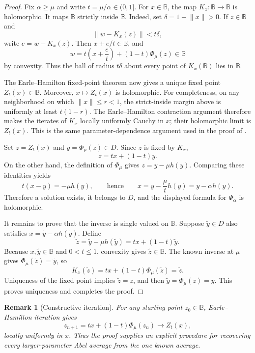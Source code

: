\documentclass[11pt]{article}
\newtheorem{remark}{Remark}
\newcommand{\B}{\mathbb B}
\begin{document}
\begin{proof}
Fix $\alpha\geq\mu$ and write $t=\mu/\alpha\in(0,1]$.  For $x\in\B$,
the map $K_x:\B\to\B$ is holomorphic.  It maps $\B$ strictly inside
$\B$.  Indeed, set $\delta=1-\lVert x\rVert>0$.  If $z\in\B$ and
\[ 
  \lVert w-K_x(z)\rVert<t\delta,
\]
write $e=w-K_x(z)$.  Then $x+e/t\in\B$, and
\[
  w=t\left(x+\frac{e}{t}\right)+(1-t)\Phi_\mu(z)\in\B
\]
by convexity.  Thus the ball of radius $t\delta$ about every point of
$K_x(\B)$ lies in $\B$.

The Earle--Hamilton fixed-point theorem \cite[Theorem 2]{Harris} now gives a
unique fixed point $Z_t(x)\in\B$.  Moreover, $x\mapsto Z_t(x)$ is
holomorphic.  For completeness, on any neighborhood on which
$\lVert x\rVert\leq r<1$, the strict-inside margin above is uniformly at
least $t(1-r)$.  The Earle--Hamilton contraction argument therefore makes
the iterates of $K_x$ locally uniformly Cauchy in $x$; their holomorphic
limit is $Z_t(x)$.  This is the same parameter-dependence argument used in
the proof of \cite[Theorem 3]{Harris}.

Set $z=Z_t(x)$ and $y=\Phi_\mu(z)\in D$.  Since $z$ is fixed by $K_x$,
\[
  z=t x+(1-t)y.
\]
On the other hand, the definition of $\Phi_\mu$ gives
$z=y-\mu h(y)$.  Comparing these identities yields
\[
  t(x-y)=-\mu h(y),
  \qquad\text{hence}\qquad
  x=y-\frac{\mu}{t}h(y)=y-\alpha h(y).
\]
Therefore a solution exists, it belongs to $D$, and the displayed formula
for $\Phi_\alpha$ is holomorphic.

It remains to prove that the inverse is single valued on $\B$.  Suppose
$\widetilde y\in D$ also satisfies
$x=\widetilde y-\alpha h(\widetilde y)$.  Define
\[
  \widetilde z
  =\widetilde y-\mu h(\widetilde y)
  =t x+(1-t)\widetilde y.
\]
Because $x,\widetilde y\in\B$ and $0<t\leq1$, convexity gives
$\widetilde z\in\B$.  The known inverse at $\mu$ gives
$\Phi_\mu(\widetilde z)=\widetilde y$, so
\[
  K_x(\widetilde z)
  =t x+(1-t)\Phi_\mu(\widetilde z)
  =\widetilde z.
\]
Uniqueness of the fixed point implies $\widetilde z=z$, and then
$\widetilde y=\Phi_\mu(z)=y$.  This proves uniqueness and completes the
proof.
\end{proof}

\begin{remark}[Constructive iteration]
For any starting point $z_0\in\B$, Earle--Hamilton iteration gives
\[
  z_{n+1}=t x+(1-t)\Phi_\mu(z_n)\longrightarrow Z_t(x),
\]
locally uniformly in $x$.  Thus the proof supplies an explicit procedure for
recovering every larger-parameter Abel average from the one known average.
\end{remark}
\end{document}
